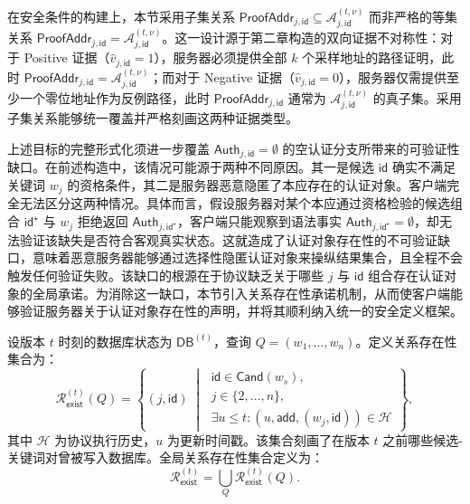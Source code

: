 在安全条件的构建上，本节采用子集关系 $\mathsf{ProofAddr}_{j,\mathsf{id}}\subseteq\mathcal{A}_{j,\mathsf{id}}^{(t,\nu)}$ 而非严格的等集关系 $\mathsf{ProofAddr}_{j,\mathsf{id}}=\mathcal{A}_{j,\mathsf{id}}^{(t,\nu)}$。这一设计源于第二章构造的双向证据不对称性：对于 Positive 证据（$\widehat{v}_{j,\mathsf{id}}=1$），服务器必须提供全部 $k$ 个采样地址的路径证明，此时 $\mathsf{ProofAddr}_{j,\mathsf{id}}=\mathcal{A}_{j,\mathsf{id}}^{(t,\nu)}$；而对于 Negative 证据（$\widehat{v}_{j,\mathsf{id}}=0$），服务器仅需提供至少一个零位地址作为反例路径，此时 $\mathsf{ProofAddr}_{j,\mathsf{id}}$ 通常为 $\mathcal{A}_{j,\mathsf{id}}^{(t,\nu)}$ 的真子集。采用子集关系能够统一覆盖并严格刻画这两种证据类型。

上述目标的完整形式化须进一步覆盖 $\mathsf{Auth}_{j,\mathsf{id}}=\emptyset$ 的空认证分支所带来的可验证性缺口。在前述构造中，该情况可能源于两种不同原因。其一是候选 $\mathsf{id}$ 确实不满足关键词 $w_j$ 的资格条件，其二是服务器恶意隐匿了本应存在的认证对象。客户端完全无法区分这两种情况。具体而言，假设服务器对某个本应通过资格检验的候选组合 $\mathsf{id}^\star$ 与 $w_j$ 拒绝返回 $\mathsf{Auth}_{j,\mathsf{id}^\star}$，客户端只能观察到语法事实 $\mathsf{Auth}_{j,\mathsf{id}^\star}=\emptyset$，却无法验证该缺失是否符合客观真实状态。这就造成了认证对象存在性的不可验证缺口，意味着恶意服务器能够通过选择性隐匿认证对象来操纵结果集合，且全程不会触发任何验证失败。该缺口的根源在于协议缺乏关于哪些 $j$ 与 $\mathsf{id}$ 组合存在认证对象的全局承诺。为消除这一缺口，本节引入关系存在性承诺机制，从而使客户端能够验证服务器关于认证对象存在性的声明，并将其顺利纳入统一的安全定义框架。

\begin{definition}[关系存在性集合]\label{def:relation-existence}
设版本 $t$ 时刻的数据库状态为 $\mathsf{DB}^{(t)}$，查询 $Q=(w_1,\ldots,w_n)$。定义关系存在性集合为：
\begin{equation}
\mathcal{R}_{\mathsf{exist}}^{(t)}(Q) = \left\{(j,\mathsf{id}) \;\middle|\; \begin{array}{l}
\mathsf{id}\in\mathsf{Cand}(w_s),\\
j\in\{2,\ldots,n\},\\
\exists u\le t: (u,\mathsf{add},(w_j,\mathsf{id}))\in\mathcal{H}
\end{array}\right\},
\end{equation}
其中 $\mathcal{H}$ 为协议执行历史，$u$ 为更新时间戳。该集合刻画了在版本 $t$ 之前哪些候选-关键词对曾被写入数据库。全局关系存在性集合定义为：
\begin{equation}
\mathcal{R}_{\mathsf{exist}}^{(t)} = \bigcup_{Q}\mathcal{R}_{\mathsf{exist}}^{(t)}(Q).
\end{equation}
\end{definition}

